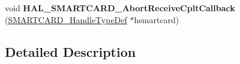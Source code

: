 \begin{DoxyCompactItemize}
\item 
\mbox{\label{group___s_m_a_r_t_c_a_r_d___exported___functions___group2_ga2ede90fc580a1f7022067a3c2daf7709}} 
void {\bfseries H\+A\+L\+\_\+\+S\+M\+A\+R\+T\+C\+A\+R\+D\+\_\+\+Abort\+Receive\+Cplt\+Callback} (\hyperlink{struct_s_m_a_r_t_c_a_r_d___handle_type_def}{S\+M\+A\+R\+T\+C\+A\+R\+D\+\_\+\+Handle\+Type\+Def} $\ast$hsmartcard)
\end{DoxyCompactItemize}


\subsection{Detailed Description}
